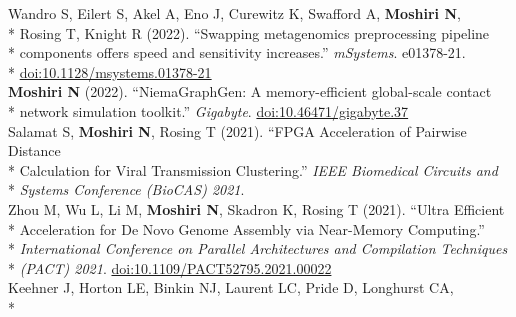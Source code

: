 \documentclass[margin,line]{res}
\begin{document}
\begin{resume}
\hspace*{9mm} Wandro S, Eilert S, Akel A, Eno J, Curewitz K, Swafford A, \textbf{Moshiri N},\\*
\hspace*{9mm} Rosing T, Knight R (2022). ``Swapping metagenomics preprocessing pipeline\\*
\hspace*{9mm} components offers speed and sensitivity increases.'' \textit{mSystems}. e01378-21.\\*\vspace{2mm}
\hspace*{8mm} \href{https://doi.org/10.1128/msystems.01378-21}{doi:10.1128/msystems.01378-21}\\
\hspace*{4mm} \textbf{Moshiri N} (2022). ``NiemaGraphGen: A memory-efficient global-scale contact\\*\vspace{2mm}
\hspace*{8mm} network simulation toolkit.'' \textit{Gigabyte}. \href{https://doi.org/10.46471/gigabyte.37}{doi:10.46471/gigabyte.37}\\
\hspace*{4mm} Salamat S, \textbf{Moshiri N}, Rosing T (2021). ``FPGA Acceleration of Pairwise Distance\\*
\hspace*{9mm} Calculation for Viral Transmission Clustering.'' \textit{IEEE Biomedical Circuits and}\\*\vspace{2mm}
\hspace*{8mm} \textit{Systems Conference (BioCAS) 2021}.\\
\hspace*{4mm} Zhou M, Wu L, Li M, \textbf{Moshiri N}, Skadron K, Rosing T (2021). ``Ultra Efficient\\*
\hspace*{9mm} Acceleration for De Novo Genome Assembly via Near-Memory Computing.''\\*
\hspace*{9mm} \textit{International Conference on Parallel Architectures and Compilation Techniques}\\*\vspace{2mm}
\hspace*{8mm} \textit{(PACT) 2021}. \href{https://doi.org/10.1109/PACT52795.2021.00022}{doi:10.1109/PACT52795.2021.00022}\\
\hspace*{4mm} Keehner J, Horton LE, Binkin NJ, Laurent LC, Pride D, Longhurst CA,\\*

\end{resume}
\end{document}
